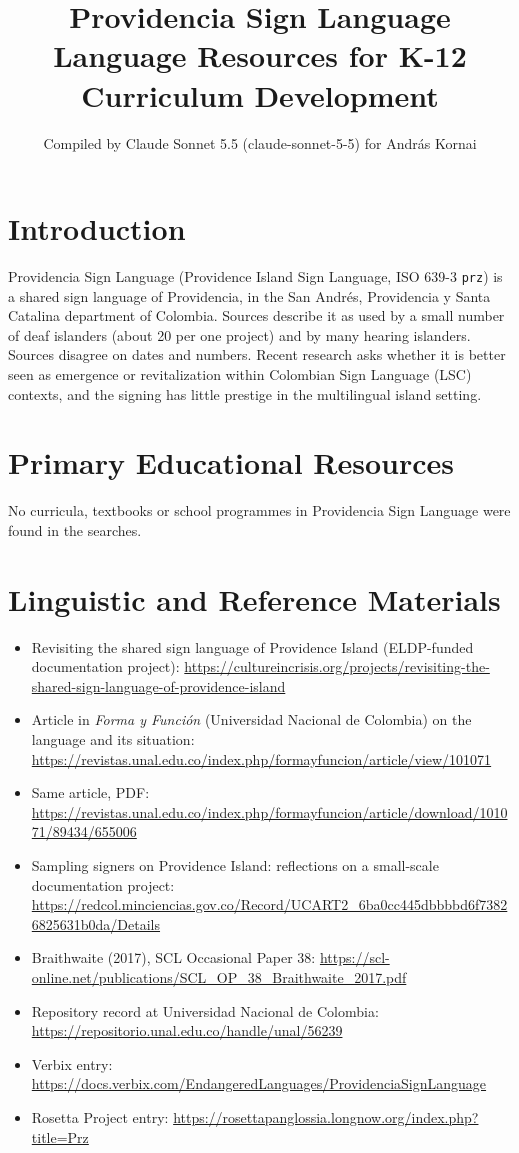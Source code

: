 \documentclass[12pt]{article}
\title{Providencia Sign Language Language Resources for K-12 Curriculum Development}
\author{Compiled by Claude Sonnet 5.5 (claude-sonnet-5-5) for Andr\'as Kornai}
\date{}
\begin{document}
\maketitle

\section{Introduction}
Providencia Sign Language (Providence Island Sign Language, ISO 639-3 \texttt{prz}) is a shared sign language of Providencia, in the San Andr\'es, Providencia y Santa Catalina department of Colombia. Sources describe it as used by a small number of deaf islanders (about 20 per one project) and by many hearing islanders. Sources disagree on dates and numbers. Recent research asks whether it is better seen as emergence or revitalization within Colombian Sign Language (LSC) contexts, and the signing has little prestige in the multilingual island setting.

\section{Primary Educational Resources}
No curricula, textbooks or school programmes in Providencia Sign Language were found in the searches.

\section{Linguistic and Reference Materials}
\begin{itemize}
\item Revisiting the shared sign language of Providence Island (ELDP-funded documentation project): \url{https://cultureincrisis.org/projects/revisiting-the-shared-sign-language-of-providence-island}
\item Article in \emph{Forma y Funci\'on} (Universidad Nacional de Colombia) on the language and its situation: \url{https://revistas.unal.edu.co/index.php/formayfuncion/article/view/101071}
\item Same article, PDF: \url{https://revistas.unal.edu.co/index.php/formayfuncion/article/download/101071/89434/655006}
\item Sampling signers on Providence Island: reflections on a small-scale documentation project: \url{https://redcol.minciencias.gov.co/Record/UCART2_6ba0cc445dbbbbd6f73826825631b0da/Details}
\item Braithwaite (2017), SCL Occasional Paper 38: \url{https://scl-online.net/publications/SCL_OP_38_Braithwaite_2017.pdf}
\item Repository record at Universidad Nacional de Colombia: \url{https://repositorio.unal.edu.co/handle/unal/56239}
\item Verbix entry: \url{https://docs.verbix.com/EndangeredLanguages/ProvidenciaSignLanguage}
\item Rosetta Project entry: \url{https://rosettapanglossia.longnow.org/index.php?title=Prz}
\end{itemize}
\end{document}

